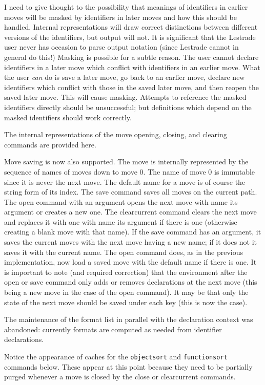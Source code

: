 \documentclass[12pt]{article}
\begin{document}
I need to give thought to the possibility that meanings of identifiers in earlier moves will be masked by identifiers in later moves and how this should be handled.  Internal
representations will draw correct distinctions between different versions of the identifiers, but output will not.  It is significant that the Lestrade user never has occasion
to parse output notation (since Lestrade cannot in general do this!)  Masking is possible for a subtle reason.  The user cannot declare identifiers in a later move which conflict with identifiers in an earlier move. What the user {\em can\/} do is save a later move, go back to an earlier move, declare new identifiers which conflict with those in the saved later move, and then reopen the saved later move.  This will cause masking.  Attempts to reference the masked identifiers directly should be unsuccessful;  but definitions which depend on the masked identifiers should work correctly.

The internal representations of the move opening, closing, and clearing commands are provided here.

Move saving is now also supported.  The move is internally represented by the sequence of names of moves down to move 0.  The name of move 0 is immutable
since it is never the next move.  The default name for a move is of course the string form of its index.  The save command saves all moves on the current path.
The open command with an argument opens the next move with name its argument or creates a new one.  The clearcurrent command clears the next move
and replaces it with one with name its argument if there is one (otherwise creating a blank move with that name).   If the save command
has an argument, it saves the current moves with the next move having a new name;  if it does not it saves it with the current name.  The open command
does, as in the previous implementation, now load a saved move with the default name if there is one.  It is important to note (and required correction) that
the environment after the open or save command only adds or removes declarations at the next move (this being a new move in the case of the
open command).  It may be that only the state of the next move should be saved under each key (this is now the case).

The maintenance of the format list in parallel with the declaration context was abandoned:  currently formats are computed as needed from identifier declarations. 

Notice the appearance of caches for the {\tt objectsort} and {\tt functionsort} commands below. These appear at this point because they need to be partially purged
whenever a move is closed by the close or clearcurrent commands.
\end{document}
